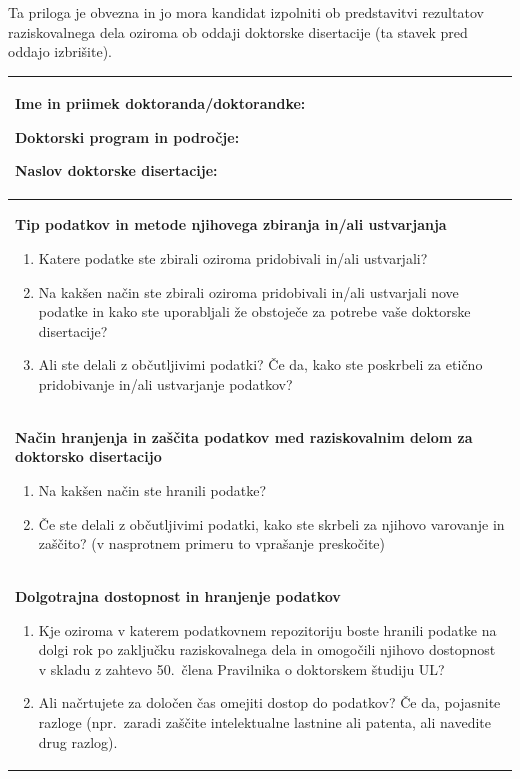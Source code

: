 \label{cha:nrrp}
Ta priloga je obvezna in jo mora kandidat izpolniti ob predstavitvi rezultatov raziskovalnega dela oziroma ob oddaji doktorske disertacije (ta stavek pred oddajo izbrišite).

\begingroup
{}
\newcommand{\nrrpPolje}[1]{\vspace*{4pt}#1\par\vspace*{12pt}}
\setlength{\tabcolsep}{6pt}
\noindent\begin{tabular}{|>{\setlength{\parskip}{8pt}}p{\dimexpr\textwidth-2\tabcolsep-2\arrayrulewidth\relax}|}
\hline
\nrrpPolje{%
  \textbf{Ime in priimek doktoranda/doktorandke:} \avtor

  \textbf{Doktorski program in področje:} \doktorskiProgram

  \textbf{Naslov doktorske disertacije:} \naslovSlo}\\
\hline
\nrrpPolje{%
  \textbf{Tip podatkov in metode njihovega zbiranja in/ali ustvarjanja}
  \begin{enumerate}
  \item Katere podatke ste zbirali oziroma pridobivali in/ali ustvarjali?
  \item Na kakšen način ste zbirali oziroma pridobivali in/ali ustvarjali nove podatke in kako ste uporabljali že obstoječe za potrebe vaše doktorske disertacije?
  \item Ali ste delali z občutljivimi podatki? Če da, kako ste poskrbeli za etično pridobivanje in/ali ustvarjanje podatkov?
  \end{enumerate}}\\
\hline
\nrrpPolje{%
  \textbf{Način hranjenja in zaščita podatkov med raziskovalnim delom za doktorsko disertacijo}
  \begin{enumerate}
  \item Na kakšen način ste hranili podatke?
  \item Če ste delali z občutljivimi podatki, kako ste skrbeli za njihovo varovanje in zaščito? (v nasprotnem primeru to vprašanje preskočite)
  \end{enumerate}}\\
\hline
\nrrpPolje{%
  \textbf{Dolgotrajna dostopnost in hranjenje podatkov}
  \begin{enumerate}
  \item Kje oziroma v katerem podatkovnem repozitoriju boste hranili podatke na dolgi rok po zaključku raziskovalnega dela in omogočili njihovo dostopnost v skladu z zahtevo 50.~člena Pravilnika o doktorskem študiju UL?
  \item Ali načrtujete za določen čas omejiti dostop do podatkov? Če da, pojasnite razloge (npr.~zaradi zaščite intelektualne lastnine ali patenta, ali navedite drug razlog).
  \end{enumerate}}\\
\hline
\end{tabular}
\endgroup
